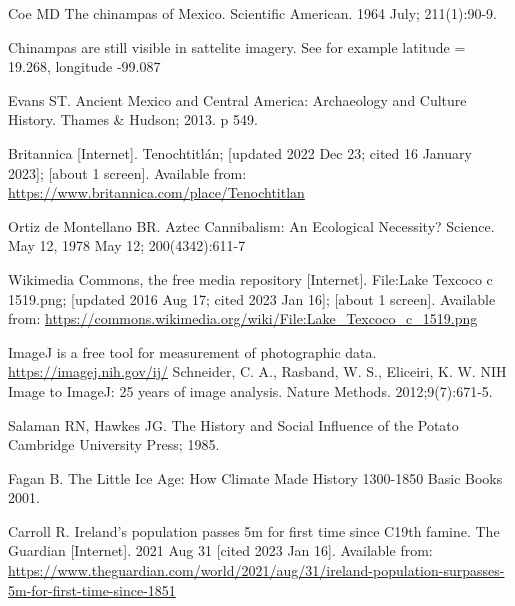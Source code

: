 \documentclass[12pt]{iopart}
\begin{document}
\begin{thebibliography}{99}
Coe MD
The chinampas of Mexico.
Scientific American.
1964 July; 211(1):90-9.

Chinampas are still visible in sattelite imagery.  See for example latitude = 19.268, longitude -99.087

Evans ST.
Ancient Mexico and Central America: Archaeology and Culture History. 
Thames \& Hudson; 2013. 
p 549.

Britannica [Internet].
Tenochtitlán;
[updated 2022 Dec 23; cited 16 January 2023]; [about 1 screen].
Available from: \url{https://www.britannica.com/place/Tenochtitlan}

Ortiz de Montellano BR.
Aztec Cannibalism: An Ecological Necessity?
Science.
May 12, 1978 May 12; 200(4342):611-7

Wikimedia Commons, the free media repository [Internet].
File:Lake Texcoco c 1519.png;
[updated 2016 Aug 17; cited 2023 Jan 16]; [about 1 screen].
Available from: \url{https://commons.wikimedia.org/wiki/File:Lake\_Texcoco\_c\_1519.png}


ImageJ is a free tool for measurement of photographic data.  
\url{https://imagej.nih.gov/ij/}
Schneider, C. A., Rasband, W. S., Eliceiri, K. W. 
NIH Image to ImageJ: 25 years of image analysis. 
Nature Methods.
2012;9(7):671-5. 

Salaman RN, Hawkes JG.
The History and Social Influence of the Potato
Cambridge University Press; 1985.

Fagan B.
The Little Ice Age: How Climate Made History 1300-1850
Basic Books 
2001.

Carroll R.
Ireland’s population passes 5m for first time since C19th famine.
The Guardian [Internet].
2021 Aug 31 [cited 2023 Jan 16].
Available from: \url{https://www.theguardian.com/world/2021/aug/31/ireland-population-surpasses-5m-for-first-time-since-1851}


\end{thebibliography}
\end{document}
